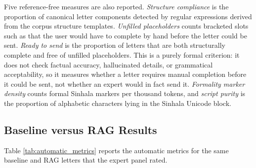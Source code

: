 \documentclass[12pt]{uomthesis}
\newcommand{\si}[1]{{\sinhalafont #1}}
\begin{document}
Five reference-free measures are also reported. \emph{Structure compliance} is the proportion of canonical letter components detected by regular expressions derived from the corpus structure templates. \emph{Unfilled placeholders} counts bracketed slots such as \si{[ඔබගේ නම]} that the user would have to complete by hand before the letter could be sent. \emph{Ready to send} is the proportion of letters that are both structurally complete and free of unfilled placeholders. This is a purely formal criterion: it does not check factual accuracy, hallucinated details, or grammatical acceptability, so it measures whether a letter requires manual completion before it could be sent, not whether an expert would in fact send it. \emph{Formality marker density} counts formal Sinhala markers per thousand tokens, and \emph{script purity} is the proportion of alphabetic characters lying in the Sinhala Unicode block.

\subsection{Baseline versus RAG Results}

Table \ref{tab:automatic_metrics} reports the automatic metrics for the same baseline and RAG letters that the expert panel rated.
\end{document}
